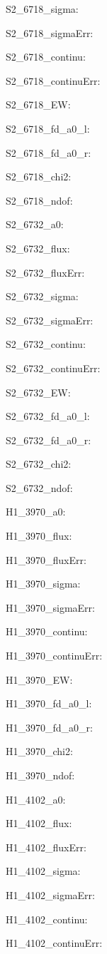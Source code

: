 \item S2\_6718\_sigma: 
\item S2\_6718\_sigmaErr: 
\item S2\_6718\_continu: 
\item S2\_6718\_continuErr: 
\item S2\_6718\_EW: 
\item S2\_6718\_fd\_a0\_l: 
\item S2\_6718\_fd\_a0\_r: 
\item S2\_6718\_chi2: 
\item S2\_6718\_ndof: 
\item S2\_6732\_a0: 
\item S2\_6732\_flux: 
\item S2\_6732\_fluxErr: 
\item S2\_6732\_sigma: 
\item S2\_6732\_sigmaErr: 
\item S2\_6732\_continu: 
\item S2\_6732\_continuErr: 
\item S2\_6732\_EW: 
\item S2\_6732\_fd\_a0\_l: 
\item S2\_6732\_fd\_a0\_r: 
\item S2\_6732\_chi2: 
\item S2\_6732\_ndof: 
\item H1\_3970\_a0: 
\item H1\_3970\_flux: 
\item H1\_3970\_fluxErr: 
\item H1\_3970\_sigma: 
\item H1\_3970\_sigmaErr: 
\item H1\_3970\_continu: 
\item H1\_3970\_continuErr: 
\item H1\_3970\_EW: 
\item H1\_3970\_fd\_a0\_l: 
\item H1\_3970\_fd\_a0\_r: 
\item H1\_3970\_chi2: 
\item H1\_3970\_ndof: 
\item H1\_4102\_a0: 
\item H1\_4102\_flux: 
\item H1\_4102\_fluxErr: 
\item H1\_4102\_sigma: 
\item H1\_4102\_sigmaErr: 
\item H1\_4102\_continu: 
\item H1\_4102\_continuErr: 
